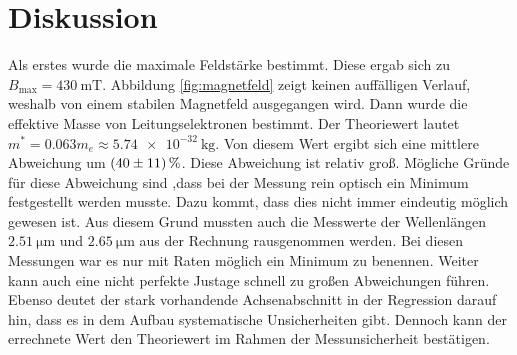 \chapter{Diskussion}
\label{cha:Diskussion}
Als erstes wurde die maximale Feldstärke bestimmt. Diese ergab sich zu $B_\mathrm{max} = \qty{430}{\milli\tesla}$. Abbildung \ref{fig:magnetfeld} zeigt keinen auffälligen Verlauf,
weshalb von einem stabilen Magnetfeld ausgegangen wird. 
Dann wurde die effektive Masse von Leitungselektronen bestimmt. Der Theoriewert lautet $m^* = \num{0.063}m_e \approx \qty{5.74e-32}{\kilo\gram}$. Von diesem Wert ergibt sich eine 
mittlere Abweichung um $\qty{40+-11}{\percent}$. Diese Abweichung ist relativ groß. Mögliche Gründe für diese Abweichung sind ,dass bei der Messung rein optisch ein Minimum 
festgestellt werden musste. Dazu kommt, dass dies nicht immer eindeutig möglich gewesen ist. Aus diesem Grund mussten auch die Messwerte der Wellenlängen $\qty{2,51}{\micro\metre}$
und  $\qty{2,65}{\micro\metre}$ aus der Rechnung rausgenommen werden. Bei diesen Messungen war es nur mit Raten möglich ein Minimum zu benennen. Weiter kann auch eine nicht perfekte 
Justage schnell zu großen Abweichungen führen. Ebenso deutet der stark vorhandende Achsenabschnitt in der Regression darauf hin, dass es in dem Aufbau systematische Unsicherheiten 
gibt. Dennoch kann der errechnete Wert den Theoriewert im Rahmen der Messunsicherheit bestätigen.